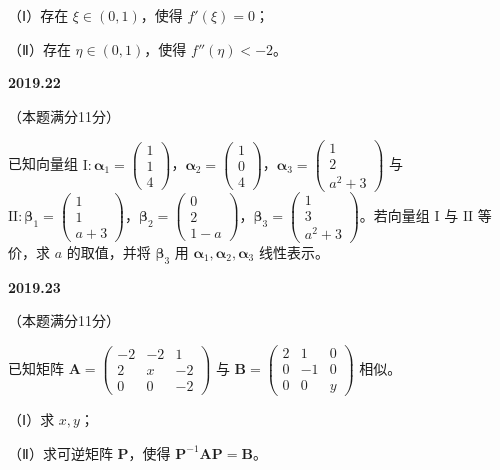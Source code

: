 \documentclass[UTF8,12pt,fontset=windows]{ctexart}
\begin{document}
（Ⅰ）存在 $\xi \in (0,1)$，使得 $f'(\xi) = 0$；

（Ⅱ）存在 $\eta \in (0,1)$，使得 $f''(\eta) < -2$。

\vfill
\newpage
{\large\bfseries 2019.22}

（本题满分11分）

已知向量组 $\mathrm{I}: \boldsymbol{\alpha}_1 = \begin{pmatrix} 1 \\ 1 \\ 4 \end{pmatrix}$，$\boldsymbol{\alpha}_2 = \begin{pmatrix} 1 \\ 0 \\ 4 \end{pmatrix}$，$\boldsymbol{\alpha}_3 = \begin{pmatrix} 1 \\ 2 \\ a^2+3 \end{pmatrix}$ 与 $\mathrm{II}: \boldsymbol{\beta}_1 = \begin{pmatrix} 1 \\ 1 \\ a+3 \end{pmatrix}$，$\boldsymbol{\beta}_2 = \begin{pmatrix} 0 \\ 2 \\ 1-a \end{pmatrix}$，$\boldsymbol{\beta}_3 = \begin{pmatrix} 1 \\ 3 \\ a^2+3 \end{pmatrix}$。若向量组 $\mathrm{I}$ 与 $\mathrm{II}$ 等价，求 $a$ 的取值，并将 $\boldsymbol{\beta}_3$ 用 $\boldsymbol{\alpha}_1, \boldsymbol{\alpha}_2, \boldsymbol{\alpha}_3$ 线性表示。

\vfill
\newpage
{\large\bfseries 2019.23}

（本题满分11分）

已知矩阵 $\boldsymbol{A} = \begin{pmatrix} -2 & -2 & 1 \\ 2 & x & -2 \\ 0 & 0 & -2 \end{pmatrix}$ 与 $\boldsymbol{B} = \begin{pmatrix} 2 & 1 & 0 \\ 0 & -1 & 0 \\ 0 & 0 & y \end{pmatrix}$ 相似。

（Ⅰ）求 $x, y$；

（Ⅱ）求可逆矩阵 $\boldsymbol{P}$，使得 $\boldsymbol{P}^{-1}\boldsymbol{A}\boldsymbol{P} = \boldsymbol{B}$。

\vfill
\end{document}
